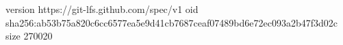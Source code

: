 version https://git-lfs.github.com/spec/v1
oid sha256:ab53b75a820c6cc6577ea5e9d41cb7687ceaf07489bd6e72ec093a2b47f3d02c
size 270020
